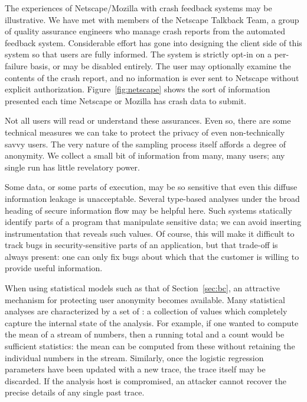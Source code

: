 The experiences of Netscape/Mozilla with crash feedback systems may be
illustrative.  We have met with members of the Netscape Talkback Team,
a group of quality assurance engineers who manage crash reports from
the automated feedback system.  Considerable effort has gone into
designing the client side of this system so that users are fully
informed.  The system is strictly opt-in on a per-failure basis, or
may be disabled entirely.  The user may optionally examine the
contents of the crash report, and no information is ever sent to
Netscape without explicit authorization.  Figure~\ref{fig:netscape}
shows the sort of information presented each time Netscape or Mozilla
has crash data to submit.

Not all users will read or understand these assurances.
  Even so, there are some technical
measures we can take to protect the privacy of even non-technically
savvy users.  The very nature of the sampling process itself affords a
degree of anonymity.  We collect a small bit of information from many,
many users; any single run has little revelatory power. 

Some data, or some parts of execution, may be so sensitive that even
this diffuse information leakage is unacceptable.  Several type-based
analyses under the broad heading of secure information flow
\cite{1997:tapsoft:volpano,ZdZhNyMy2001} may be helpful here.  Such
systems statically identify parts of a program that manipulate
sensitive data; we can avoid inserting instrumentation that reveals
such values.  Of course, this will make it difficult to track bugs in
security-sensitive parts of an application, but that trade-off is
always present: one can only fix bugs about which that the customer is
willing to provide useful information.  

When using statistical models such as that of Section~\ref{sec:bc}, an
attractive mechanism for protecting user anonymity becomes available.
Many statistical analyses are characterized by a set of
: a collection of values which
completely capture the internal state of the analysis.  For example,
if one wanted to compute the mean of a stream of numbers, then a
running total and a count would be sufficient statistics: the mean can
be computed from these without retaining the individual numbers in the
stream.  Similarly, once the logistic regression parameters have been
updated with a new trace, the trace itself may be discarded.  If the
analysis host is compromised, an attacker cannot recover the precise
details of any single past trace.

